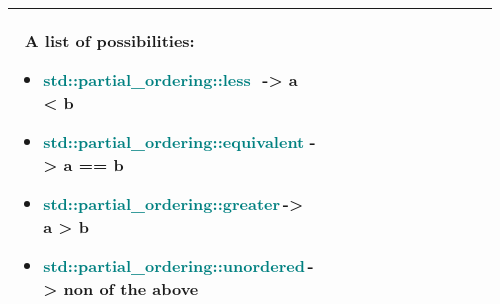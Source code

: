 \documentclass[main.tex,fontsize=8pt,paper=a4,paper=portrait,DIV=calc,]{scrartcl}
\begin{document}
\begin{table}[ht!]
\begin{tabular}{|m{0.2\linewidth}|m{0.755\linewidth}|}
\, \newline
A list of possibilities:\newline
\begin{itemize}
  \item \textcolor{teal}{std::partial\_ordering::less} \,\,-> a < b 
  \item \textcolor{teal}{std::partial\_ordering::equivalent}\,\,-> a == b 
  \item \textcolor{teal}{std::partial\_ordering::greater}\,-> a > b
  \item \textcolor{teal}{std::partial\_ordering::unordered}\,-> non of the above
  \vspace{-3mm}
\end{itemize}\\
\hline
\end{tabular}
\end{table}
\pagebreak
\end{document}
